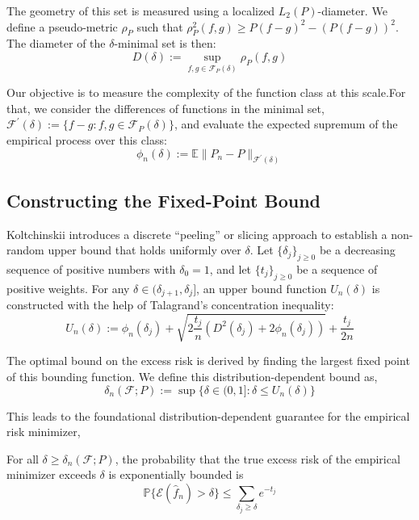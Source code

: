 The geometry of this set is measured using a localized $L_2(P)$-diameter. We define a pseudo-metric $\rho_P$ such that $\rho_P^2(f,g) \ge P(f-g)^2 - (P(f-g))^2$. The diameter of the $\delta$-minimal set is then:
\[
  D(\delta) := \sup_{f,g\in\mathcal{F}_P(\delta)} \rho_P(f,g)
\]

Our objective is to measure the complexity of the function class at this scale.For that, we consider the differences of functions in the minimal set, $\mathcal{F}^{\prime}(\delta) := \{f-g : f,g \in \mathcal{F}_P(\delta)\}$, and evaluate the expected supremum of the empirical process over this class:
\begin{equation}
  \phi_n(\delta) := \mathbb{E}\|P_n - P\|_{\mathcal{F}^{\prime}(\delta)}
\end{equation}

\subsection{Constructing the Fixed-Point Bound}
Koltchinskii introduces a discrete ``peeling'' or slicing approach to establish a non-random upper bound that holds uniformly over $\delta$. Let $\{\delta_j\}_{j\ge 0}$ be a decreasing sequence of positive numbers with $\delta_0 = 1$, and let $\{t_j\}_{j\ge 0}$ be a sequence of positive weights. For any $\delta \in (\delta_{j+1}, \delta_j]$, an upper bound function $U_n(\delta)$ is constructed with the help of Talagrand's concentration inequality:
\[
  U_n(\delta) := \phi_n(\delta_j) + \sqrt{2\frac{t_j}{n}(D^2(\delta_j) + 2\phi_n(\delta_j))} + \frac{t_j}{2n}
\]

The optimal bound on the excess risk is derived by finding the largest fixed point of this bounding function. We define this distribution-dependent bound as,
\[
  \delta_n(\mathcal{F}; P) := \sup\{\delta \in (0, 1] : \delta \le U_n(\delta)\}
\]

This leads to the foundational distribution-dependent guarantee for the empirical risk minimizer,

\vspace{0.5em}
\begin{theorem}
  For all $\delta \ge \delta_n(\mathcal{F}; P)$, the probability that the true excess risk of the empirical minimizer exceeds $\delta$ is exponentially bounded is
  \[
    \mathbb{P}\{\mathcal{E}(\hat{f}_n) > \delta\} \le \sum_{\delta_j \ge \delta} e^{-t_j}
  \]
\end{theorem}

